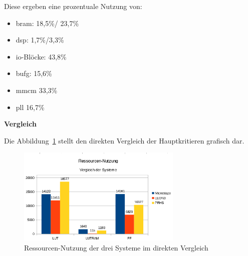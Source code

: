Diese ergeben eine prozentuale Nutzung von:\\
\begin{itemize}
  \item \ac{bram}: 18,5\%/ 23,7\%
  \item \ac{dsp}:  1,7\%/3,3\%
  \item \ac{io}-Blöcke: 43,8\%
  \item \ac{bufg}: 15,6\%
  \item \ac{mmcm} 33,3\%
  \item \ac{pll} 16,7\%
\end{itemize}


\textbf{Vergleich}

Die Abbildung~\ref{fig:ressourcenresult} stellt den direkten Vergleich der Hauptkritieren grafisch dar.\\

\begin{figure}[H]
\centering
\includegraphics[width=0.7\textwidth]{Hauptteil/ressourcenresult.png}
\caption{Ressourcen-Nutzung der drei Systeme im direkten Vergleich}
\label{fig:ressourcenresult}
\end{figure}

